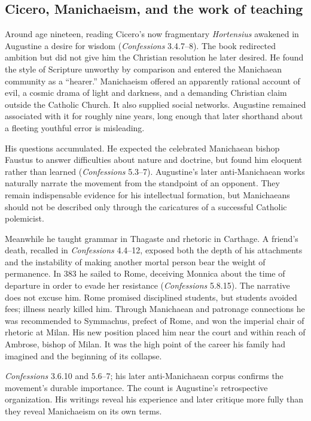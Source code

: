 \subsection{Cicero, Manichaeism, and the work of teaching}

Around age nineteen, reading Cicero's now fragmentary \emph{Hortensius}
awakened in Augustine a desire for wisdom (\emph{Confessions} 3.4.7--8). The
book redirected ambition but did not give him the Christian resolution he
later desired. He found the style of Scripture unworthy by comparison and
entered the Manichaean community as a “hearer.” Manichaeism offered an
apparently rational account of evil, a cosmic drama of light and darkness,
and a demanding Christian claim outside the Catholic Church. It also supplied
social networks. Augustine remained associated with it for roughly nine
years, long enough that later shorthand about a fleeting youthful error is
misleading.

His questions accumulated. He expected the celebrated Manichaean bishop
Faustus to answer difficulties about nature and doctrine, but found him
eloquent rather than learned (\emph{Confessions} 5.3--7). Augustine's later
anti-Manichaean works naturally narrate the movement from the standpoint of an
opponent. They remain indispensable evidence for his intellectual formation,
but Manichaeans should not be described only through the caricatures of a
successful Catholic polemicist.

Meanwhile he taught grammar in Thagaste and rhetoric in Carthage. A friend's
death, recalled in \emph{Confessions} 4.4--12, exposed both the depth of his
attachments and the instability of making another mortal person bear the
weight of permanence. In 383 he sailed to Rome, deceiving Monnica about the
time of departure in order to evade her resistance (\emph{Confessions}
5.8.15). The narrative does not excuse him. Rome promised disciplined students,
but students avoided fees; illness nearly killed him. Through Manichaean and
patronage connections he was recommended to Symmachus, prefect of Rome, and
won the imperial chair of rhetoric at Milan. His new position placed him near
the court and within reach of Ambrose, bishop of Milan. It was the high point
of the career his family had imagined and the beginning of its collapse.

{\emph{Confessions} 3.6.10 and 5.6--7; his later anti-Manichaean corpus
confirms the movement's durable importance.}
{The count is Augustine's retrospective organization. His writings reveal his
experience and later critique more fully than they reveal Manichaeism on its
own terms.}
